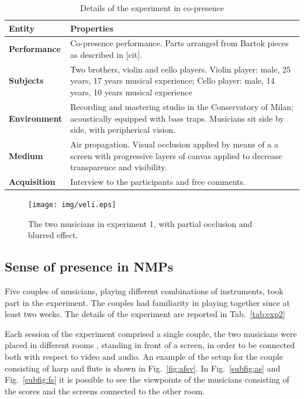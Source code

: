 \begin{table}
\centering
\caption{Details of the experiment in co-presence}
\begin{tabular}{p{1.5cm}p{6cm}}
\hline
\textbf{Entity} & \textbf{Properties} \\
\hline
\textbf{Performance} & Co-presence performance. \newline Parts arranged from Bartok pieces as described in [cit]. \\
\textbf{Subjects} & Two brothers, violin and cello players. \newline Violin player: male, 25 years, 17 years musical experience; 	\newline Cello player: male, 14 years, 10 years  musical experience \\
\textbf{Environment} & Recording and mastering studio in the Conservatory of Milan; acoustically equipped with bass traps. \newline Musicians sit side by side, with peripherical vision.\\
\textbf{Medium} & Air propagation. \newline Visual occlusion applied by means of a a screen with progressive layers of canvas applied to decrease transparence and visibility. \\
\textbf{Acquisition} & Interview to the participants and free comments.\\
\hline
\end{tabular}
\label{tab:exp1}
\end{table}


\begin{figure}[t]
	\centering
	\texttt{[image: img/veli.eps]}
	\caption{The two musicians in experiment 1, with partial occlusion and blurred effect.}
	\label{fig:veli}
\end{figure}


\subsection{Sense of presence in NMPs}
Five couples of musicians, playing different combinations of instruments, took part in the experiment. The couples had familiarity in playing together since at least two weeks. The details of the experiment are reported in Tab.~\ref{tab:exp2}

Each session of the experiment comprised a single couple, the two musicians were placed in different rooms , standing in front of a screen, in order to be connected both with respect to video and audio. An example of the setup for the couple consisting of harp and flute is shown in Fig.~\ref{fig:afsv}. In Fig.~\ref{subfig:as} and Fig.~\ref{subfig:fs} it is possible to see the viewpoints of the musicians consisting of the scores and the screens connected to the other room.

